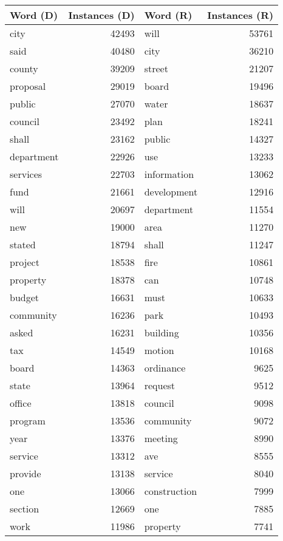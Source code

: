 \begin{table}[ht]
\centering
\begingroup\fontsize{9pt}{10pt}\selectfont
\begin{tabular}{lrlr}
  \hline
Word (D) & Instances (D) & Word (R) & Instances (R) \\ 
  \hline
city & 42493 & will & 53761 \\ 
  said & 40480 & city & 36210 \\ 
  county & 39209 & street & 21207 \\ 
  proposal & 29019 & board & 19496 \\ 
  public & 27070 & water & 18637 \\ 
  council & 23492 & plan & 18241 \\ 
  shall & 23162 & public & 14327 \\ 
  department & 22926 & use & 13233 \\ 
  services & 22703 & information & 13062 \\ 
  fund & 21661 & development & 12916 \\ 
  will & 20697 & department & 11554 \\ 
  new & 19000 & area & 11270 \\ 
  stated & 18794 & shall & 11247 \\ 
  project & 18538 & fire & 10861 \\ 
  property & 18378 & can & 10748 \\ 
  budget & 16631 & must & 10633 \\ 
  community & 16236 & park & 10493 \\ 
  asked & 16231 & building & 10356 \\ 
  tax & 14549 & motion & 10168 \\ 
  board & 14363 & ordinance & 9625 \\ 
  state & 13964 & request & 9512 \\ 
  office & 13818 & council & 9098 \\ 
  program & 13536 & community & 9072 \\ 
  year & 13376 & meeting & 8990 \\ 
  service & 13312 & ave & 8555 \\ 
  provide & 13138 & service & 8040 \\ 
  one & 13066 & construction & 7999 \\ 
  section & 12669 & one & 7885 \\ 
  work & 11986 & property & 7741 \\ 

\end{tabular}
\end{table}

